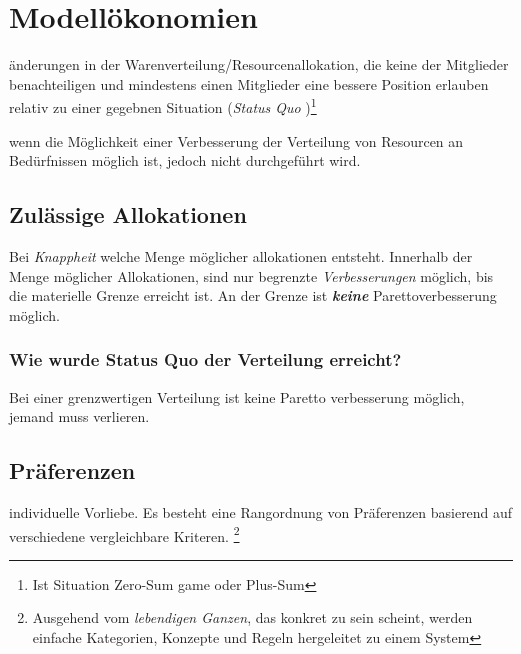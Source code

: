 
\section{Modellökonomien}

\begin{definition}
     änderungen in der Warenverteilung/Resourcenallokation, die keine der Mitglieder benachteiligen und mindestens einen Mitglieder eine bessere Position erlauben relativ zu einer gegebnen Situation (\textit{Status Quo })\footnote{Ist Situation Zero-Sum game oder Plus-Sum}
\end{definition}

\begin{definition}
    [Ineffizienz] wenn die Möglichkeit einer Verbesserung der Verteilung von Resourcen an Bedürfnissen möglich ist, jedoch nicht durchgeführt wird.
\end{definition}

\subsection{Zulässige Allokationen}
Bei \textit{Knappheit} welche Menge möglicher allokationen entsteht. Innerhalb der Menge möglicher Allokationen, sind nur begrenzte \textit{Verbesserungen} möglich, bis die materielle Grenze erreicht ist. An der Grenze ist \textit{\textbf{keine}} Parettoverbesserung möglich.

\subsubsection{Wie wurde Status Quo der Verteilung erreicht?}
Bei einer grenzwertigen Verteilung ist keine Paretto verbesserung möglich, jemand muss verlieren.

\subsection{Präferenzen}

\begin{definition}
    [Präferenz] individuelle Vorliebe. Es besteht eine Rangordnung von Präferenzen basierend auf verschiedene vergleichbare Kriteren. \footnote{Ausgehend vom \textit{lebendigen Ganzen}, das konkret zu sein scheint, werden einfache Kategorien, Konzepte und Regeln hergeleitet zu einem System}
\end{definition}

